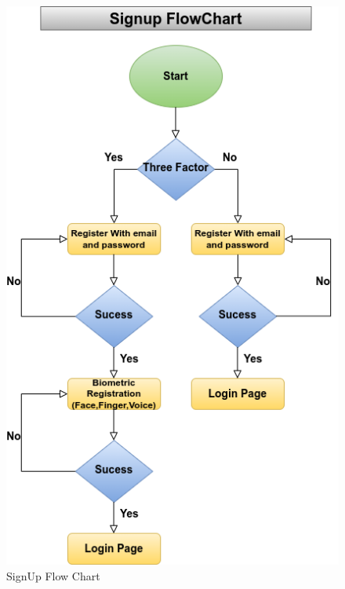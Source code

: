 \documentclass[conference]{IEEEtran}
\begin{document}
\begin{figure}[htbp]
	\centerline{\includegraphics[width=0.8\columnwidth]{signup.png}}
	\caption{SignUp Flow Chart }
	\label{fig}
\end{figure}
\end{document}
